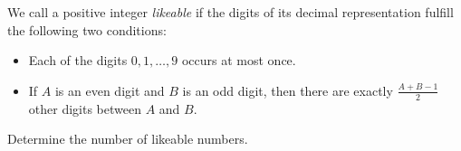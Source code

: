 We call a positive integer \emph{likeable} if the digits of its decimal representation fulfill the following two conditions:
\begin{itemize}
    \item Each of the digits $0,1,\ldots, 9$ occurs at most once.
    \item If $A$ is an even digit and $B$ is an odd digit, then there are exactly
    $\frac{A+B-1}{2}$ other digits between $A$ and $B$.
\end{itemize}
Determine the number of likeable numbers.
